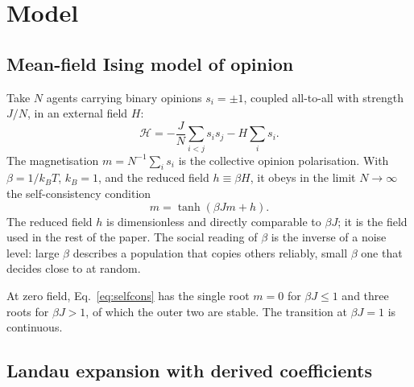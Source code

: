 \documentclass[preprint,12pt]{elsarticle}
\begin{document}
\section{Model}
\label{sec:model}

\subsection{Mean-field Ising model of opinion}

Take $N$ agents carrying binary opinions $s_i = \pm 1$, coupled all-to-all with strength
$J/N$, in an external field $H$:
\begin{equation}
\mathcal{H} = -\frac{J}{N}\sum_{i<j} s_i s_j - H \sum_i s_i .
\end{equation}
The magnetisation $m = N^{-1}\sum_i s_i$ is the collective opinion polarisation. With
$\beta = 1/k_B T$, $k_B = 1$, and the reduced field $h \equiv \beta H$, it obeys in the limit
$N \to \infty$ the self-consistency condition
\begin{equation}
m = \tanh\!\left(\beta J m + h\right).
\label{eq:selfcons}
\end{equation}
The reduced field $h$ is dimensionless and directly comparable to $\beta J$; it is the field
used in the rest of the paper. The social reading of $\beta$ is the inverse of a noise level:
large $\beta$ describes a population that copies others reliably, small $\beta$ one that
decides close to at random.

At zero field, Eq.~\eqref{eq:selfcons} has the single root $m = 0$ for $\beta J \le 1$ and
three roots for $\beta J > 1$, of which the outer two are stable. The transition at
$\beta J = 1$ is continuous.

\subsection{Landau expansion with derived coefficients}
\label{sec:landau}
\end{document}

